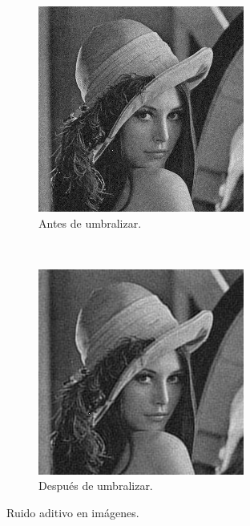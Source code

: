 \documentclass[a4paper,10pt,twoside]{article}
\begin{document}
\begin{figure}[H]
  \centering
  \begin{subfigure}[b]{0.45\textwidth}
    \centering
    \includegraphics[width=\textwidth]{graficos/lena_aditivo_muestra.png}    
    \caption{Antes de umbralizar.}
  \end{subfigure}
  ~ 
  \begin{subfigure}[b]{0.45\textwidth}
    \centering
    \includegraphics[width=\textwidth]{graficos/lena_aditivo_umbralizar_muestra.png}
    \caption{Después de umbralizar.}
  \end{subfigure}
  \caption{Ruido aditivo en imágenes.}
\end{figure}
\end{document}
